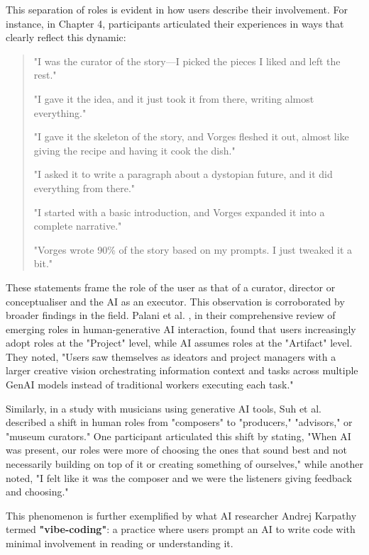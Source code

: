 This separation of roles is evident in how users describe their involvement. For instance, in Chapter 4, participants articulated their experiences in ways that clearly reflect this dynamic:

\begin{quote}
"I was the curator of the story—I picked the pieces I liked and left the rest."

"I gave it the idea, and it just took it from there, writing almost everything."

"I gave it the skeleton of the story, and Vorges fleshed it out, almost like giving the recipe and having it cook the dish."

"I asked it to write a paragraph about a dystopian future, and it did everything from there."

"I started with a basic introduction, and Vorges expanded it into a complete narrative."

"Vorges wrote 90\% of the story based on my prompts. I just tweaked it a bit."
\end{quote}

These statements frame the role of the user as that of a curator, director or conceptualiser and the AI as an executor. This observation is corroborated by broader findings in the field. Palani et al. \cite{Palani2024-on}, in their comprehensive review of emerging roles in human-generative AI interaction, found that users increasingly adopt roles at the "Project" level, while AI assumes roles at the "Artifact" level. They noted, "Users saw themselves as ideators and project managers with a larger creative vision orchestrating information context and tasks across multiple GenAI models instead of traditional workers executing each task."

Similarly, in a study with musicians using generative AI tools, Suh et al. \cite{Suh2021-cj} described a shift in human roles from "composers" to "producers," "advisors," or "museum curators." One participant articulated this shift by stating, "When AI was present, our roles were more of choosing the ones that sound best and not necessarily building on top of it or creating something of ourselves," while another noted, "I felt like it was the composer and we were the listeners giving feedback and choosing."

This phenomenon is further exemplified by what AI researcher Andrej Karpathy termed \textbf{"vibe-coding"}: a practice where users prompt an AI to write code with minimal involvement in reading or understanding it.

